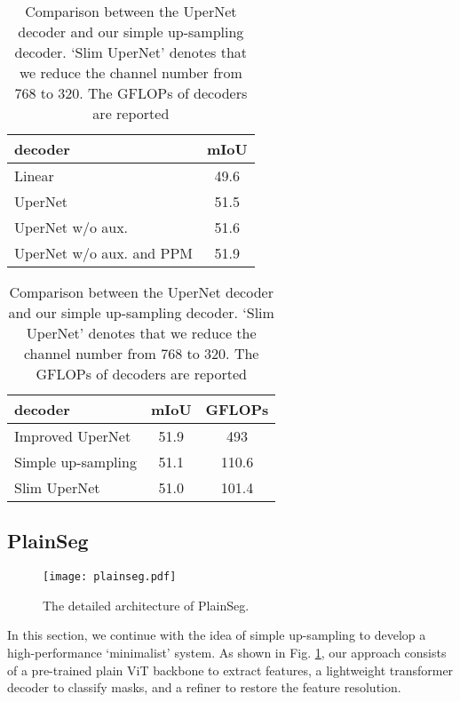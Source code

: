 \documentclass{article} \usepackage{iclr2024_conference,times}
\begin{document}
\begin{table}[h]
\small
\begin{minipage}[c]{0.48\textwidth}
\caption{Ablation study on components of the UperNet decoder. `aux.' denotes the auxiliary supervision of deep features}
\begin{center}
\label{tab:1}
\begin{tabular}{lc}
\toprule
decoder &mIoU\\\midrule
Linear &49.6  \\
UperNet &51.5 \\
UperNet w/o aux. &51.6 \\
UperNet w/o aux. and PPM&51.9 \\
\bottomrule
\end{tabular}
\end{center}
\end{minipage}
\hspace{.15in}
\begin{minipage}[c]{0.48\textwidth}
\caption{Comparison between the UperNet decoder and our simple up-sampling decoder. `Slim UperNet' denotes that we reduce the channel number from 768 to 320. The GFLOPs of decoders are reported}
\begin{center}
\label{tab:2}
\begin{tabular}{lcc}
\toprule
decoder &mIoU & GFLOPs \\\midrule
Improved UperNet &51.9 & 493 \\
Simple up-sampling&51.1 &110.6\\
Slim UperNet& 51.0 & 101.4\\
\bottomrule
\end{tabular}
\end{center}
\end{minipage}
\end{table}


\subsection{PlainSeg}

\begin{figure}
  \centerline{\texttt{[image: plainseg.pdf]}}
  \caption{The detailed architecture of PlainSeg.}
  \label{fig1}
\end{figure}

In this section, we continue with the idea of simple up-sampling to develop a high-performance `minimalist' system. As shown in Fig. \ref{fig1}, our approach consists of a pre-trained plain ViT backbone to extract features, a lightweight transformer decoder to classify masks, and a refiner to restore the feature resolution.
\end{document}
